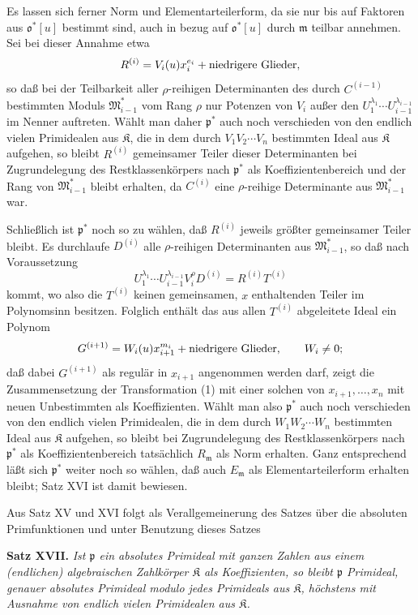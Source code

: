 \documentclass[11pt]{article}
\providecommand{\frakm}{\mathfrak m}
\providecommand{\frakp}{\mathfrak p}
\begin{document}
Es lassen sich ferner Norm und Elementarteilerform, da sie nur bis auf Faktoren aus $\mathfrak o^*[u]$ bestimmt sind, auch in bezug auf $\mathfrak o^*[u]$ durch $\frakm$ teilbar annehmen. Sei bei dieser Annahme etwa
\[
 R^{(i)}=V_i(u)x_i^{e_i}+\hbox{niedrigere Glieder},
\]
so daß bei der Teilbarkeit aller $\rho$-reihigen Determinanten des durch $C^{(i-1)}$ bestimmten Moduls $\mathfrak M_{i-1}^*$ vom Rang $\rho$ nur Potenzen von $V_i$ außer den $U_1^{\lambda_1}\cdots U_{i-1}^{\lambda_{i-1}}$ im Nenner auftreten. Wählt man daher $\frakp^*$ auch noch verschieden von den endlich vielen Primidealen aus $\mathfrak K$, die in dem durch $V_1V_2\cdots V_n$ bestimmten Ideal aus $\mathfrak K$ aufgehen, so bleibt $R^{(i)}$ gemeinsamer Teiler dieser Determinanten bei Zugrundelegung des Restklassenkörpers nach $\frakp^*$ als Koeffizientenbereich und der Rang von $\mathfrak M_{i-1}^*$ bleibt erhalten, da $C^{(i)}$ eine $\rho$-reihige Determinante aus $\mathfrak M_{i-1}^*$ war.

Schließlich ist $\frakp^*$ noch so zu wählen, daß $R^{(i)}$ jeweils größter gemeinsamer Teiler bleibt. Es durchlaufe $D^{(i)}$ alle $\rho$-reihigen Determinanten aus $\mathfrak M_{i-1}^*$, so daß nach Voraussetzung
\[
 U_1^{\lambda_1}\cdots U_{i-1}^{\lambda_{i-1}}V_i^{\rho}D^{(i)}=R^{(i)}T^{(i)}
\]
kommt, wo also die $T^{(i)}$ keinen gemeinsamen, $x$ enthaltenden Teiler im Polynomsinn besitzen. Folglich enthält das aus allen $T^{(i)}$ abgeleitete Ideal ein Polynom
\[
 G^{(i+1)}=W_i(u)x_{i+1}^{m_i}+\hbox{niedrigere Glieder},\qquad W_i\ne0;
\]
daß dabei $G^{(i+1)}$ als regulär in $x_{i+1}$ angenommen werden darf, zeigt die Zusammensetzung der Transformation (1) mit einer solchen von $x_{i+1},\ldots,x_n$ mit neuen Unbestimmten als Koeffizienten. Wählt man also $\frakp^*$ auch noch verschieden von den endlich vielen Primidealen, die in dem durch $W_1W_2\cdots W_n$ bestimmten Ideal aus $\mathfrak K$ aufgehen, so bleibt bei Zugrundelegung des Restklassenkörpers nach $\frakp^*$ als Koeffizientenbereich tatsächlich $R_\frakm$ als Norm erhalten. Ganz entsprechend läßt sich $\frakp^*$ weiter noch so wählen, daß auch $E_\frakm$ als Elementarteilerform erhalten bleibt; Satz XVI ist damit bewiesen.

Aus Satz XV und XVI folgt als Verallgemeinerung des Satzes über die absoluten Primfunktionen und unter Benutzung dieses Satzes

\textbf{Satz XVII.} \emph{Ist $\frakp$ ein absolutes Primideal mit ganzen Zahlen aus einem (endlichen) algebraischen Zahlkörper $\mathfrak K$ als Koeffizienten, so bleibt $\frakp$ Primideal, genauer absolutes Primideal modulo jedes Primideals aus $\mathfrak K$, höchstens mit Ausnahme von endlich vielen Primidealen aus $\mathfrak K$.}
\end{document}
